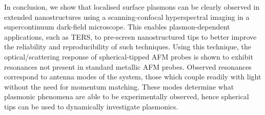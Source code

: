 \documentclass{article}
\begin{document}
In conclusion, we show that localised surface plasmons can be clearly observed in extended nanostructures using a scanning-confocal hyperspectral imaging in a supercontinuum dark-field microscope. This enables plasmon-dependent applications, such as TERS, to pre-screen nanostructured tips to better improve the reliability and reproducibility of such techniques. Using this technique, the optical/scattering response of spherical-tipped AFM probes is shown to exhibit resonances not present in standard metallic AFM probes. Observed resonances correspond to antenna modes of the system, those which couple readily with light without the need for momentum matching. These modes determine what plasmonic phenomena are able to be experimentally observed, hence spherical tips can be used to dynamically investigate plasmonics.
\end{document}
